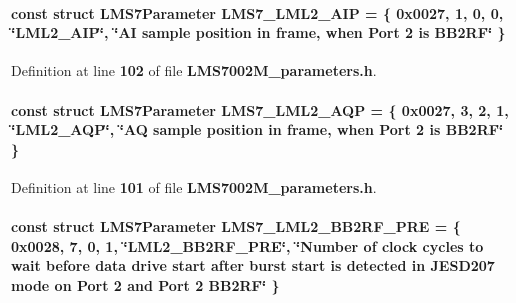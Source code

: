 \paragraph[{L\+M\+S7\+\_\+\+L\+M\+L2\+\_\+\+A\+IP}]{\setlength{\rightskip}{0pt plus 5cm}const struct {\bf L\+M\+S7\+Parameter} L\+M\+S7\+\_\+\+L\+M\+L2\+\_\+\+A\+IP = \{ 0x0027, 1, 0, 0, \char`\"{}\+L\+M\+L2\+\_\+\+A\+I\+P\char`\"{}, \char`\"{}\+A\+I sample position in frame, when Port 2 is B\+B2\+R\+F\char`\"{} \}\hspace{0.3cm}{\ttfamily [static]}}\label{LMS7002M__parameters_8h_ad5670b86305125754648863ea5e66100}


Definition at line {\bf 102} of file {\bf L\+M\+S7002\+M\+\_\+parameters.\+h}.

\paragraph[{L\+M\+S7\+\_\+\+L\+M\+L2\+\_\+\+A\+QP}]{\setlength{\rightskip}{0pt plus 5cm}const struct {\bf L\+M\+S7\+Parameter} L\+M\+S7\+\_\+\+L\+M\+L2\+\_\+\+A\+QP = \{ 0x0027, 3, 2, 1, \char`\"{}\+L\+M\+L2\+\_\+\+A\+Q\+P\char`\"{}, \char`\"{}\+A\+Q sample position in frame, when Port 2 is B\+B2\+R\+F\char`\"{} \}\hspace{0.3cm}{\ttfamily [static]}}\label{LMS7002M__parameters_8h_a4d961bd3004287e8405a9094a64b5d65}


Definition at line {\bf 101} of file {\bf L\+M\+S7002\+M\+\_\+parameters.\+h}.

\paragraph[{L\+M\+S7\+\_\+\+L\+M\+L2\+\_\+\+B\+B2\+R\+F\+\_\+\+P\+RE}]{\setlength{\rightskip}{0pt plus 5cm}const struct {\bf L\+M\+S7\+Parameter} L\+M\+S7\+\_\+\+L\+M\+L2\+\_\+\+B\+B2\+R\+F\+\_\+\+P\+RE = \{ 0x0028, 7, 0, 1, \char`\"{}\+L\+M\+L2\+\_\+\+B\+B2\+R\+F\+\_\+\+P\+R\+E\char`\"{}, \char`\"{}\+Number of clock cycles to wait before data drive start after burst start is detected in J\+E\+S\+D207 mode on Port 2 and Port 2 B\+B2\+R\+F\char`\"{} \}\hspace{0.3cm}{\ttfamily [static]}}\label{LMS7002M__parameters_8h_a1f7fa1bc3edd25be78c8bfbc9ad71e6c}


